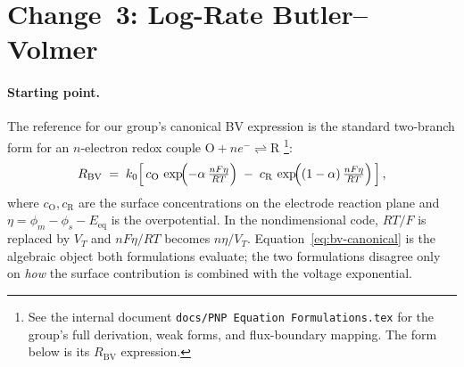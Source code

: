 \documentclass[11pt]{article}
\newcommand{\Eeq}{E_{\mathrm{eq}}}
\newcommand{\VT}{V_{T}}
\begin{document}
\section{Change~3: Log-Rate Butler--Volmer}
\paragraph{Starting point.}
The reference for our group's canonical BV expression is the standard
two-branch form for an $n$-electron redox couple
$\mathrm{O} + n e^{-} \rightleftharpoons \mathrm{R}$%
\footnote{See the internal document \texttt{docs/PNP Equation
Formulations.tex} for the group's full derivation, weak forms, and
flux-boundary mapping. The form below is its
$R_{\mathrm{BV}}$ expression.}:
\begin{equation}
  \label{eq:bv-canonical}
  R_{\mathrm{BV}}
  \;=\;
  k_0
  \!\left[\,
  c_{\mathrm{O}}\,\exp\!\Bigl(-\alpha\,\tfrac{n F \eta}{RT}\Bigr)
  \;-\;
  c_{\mathrm{R}}\,\exp\!\Bigl((1-\alpha)\,\tfrac{n F \eta}{RT}\Bigr)
  \,\right],
\end{equation}
where $c_{\mathrm{O}}, c_{\mathrm{R}}$ are the surface concentrations on the
electrode reaction plane and $\eta = \phi_m - \phi_s - \Eeq$ is the
overpotential. In the nondimensional code, $RT/F$ is replaced by $\VT$ and
$n F \eta / RT$ becomes $n\eta/\VT$. Equation~\eqref{eq:bv-canonical} is
the algebraic object both formulations evaluate; the two formulations
disagree only on \emph{how} the surface contribution is combined with the
voltage exponential.
\end{document}

